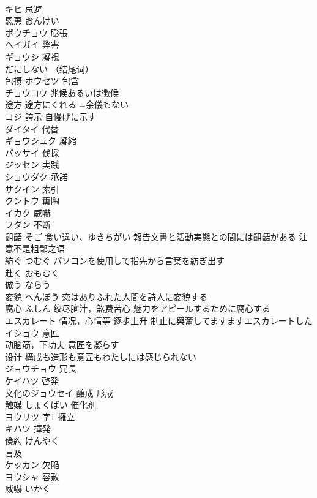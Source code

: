 \documentclass[8pt]{extreport}
\begin{document}
\begin{CJK}{UTF8}{min}
\\	キヒ	忌避
\\	恩恵	おんけい
\\	ボウチョウ	膨張
\\	ヘイガイ	弊害
\\	ギョウシ	凝視
\\	だにしない （结尾词）	
\\	包摂	ホウセツ 包含
\\	チョウコウ	兆候あるいは徴候
\\	途方	途方にくれる =余儀もない
\\	コジ	誇示 自慢げに示す
\\	ダイタイ	代替
\\	ギョウシュク	凝縮
\\	バッサイ	伐採
\\	ジッセン	実践
\\	ショウダク	承諾
\\	サクイン	索引
\\	クントウ	薫陶
\\	イカク	威嚇
\\	フダン	不断
\\	齟齬	そご 食い違い、ゆきちがい 報告文書と活動実態との間には齟齬がある 注意不是粗鄙之语
\\	紡ぐ	つむぐ パソコンを使用して指先から言葉を紡ぎ出す
\\	赴く	おもむく
\\	倣う	ならう
\\	変貌	へんぼう 恋はありふれた人間を詩人に変貌する
\\	腐心	ふしん 绞尽脑汁，煞费苦心 魅力をアピールするために腐心する
\\	エスカレート	情况，心情等 逐步上升 制止に興奮してますますエスカレートした
\\	イショウ	意匠 
\\	动脑筋，下功夫 意匠を凝らす 
\\	设计 構成も造形も意匠もわたしには感じられない
\\	ジョウチョウ	冗長
\\	ケイハツ	啓発
\\	文化のジョウセイ	醸成 形成
\\	触媒	しょくばい 催化剂
\\	ヨウリツ 字1	擁立
\\	キハツ	揮発
\\	倹約	けんやく
\\	言及	
\\	ケッカン	欠陥
\\	ヨウシャ	容赦
\\	威嚇	いかく

\end{CJK}
\end{document}
